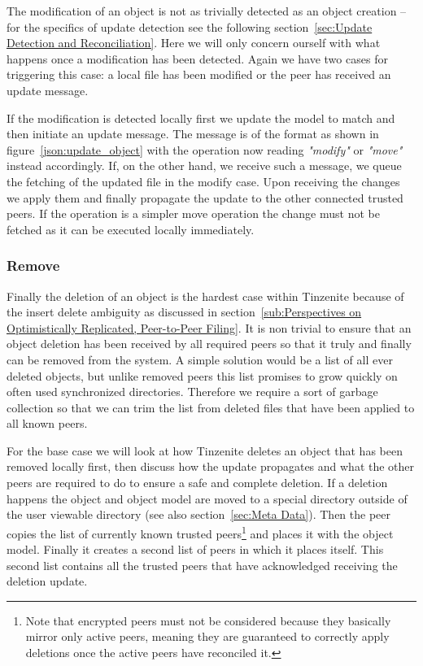 The modification of an object is not as trivially detected as an object creation – for the specifics of update detection see the following section~\ref{sec:Update Detection and Reconciliation}.
Here we will only concern ourself with what happens once a modification has been detected.
Again we have two cases for triggering this case: a local file has been modified or the peer has received an update message.

If the modification is detected locally first we update the model to match and then initiate an update message.
The message is of the format as shown in figure~\ref{json:update_object} with the operation now reading \textit{"modify"} or \textit{"move"} instead accordingly.
If, on the other hand, we receive such a message, we queue the fetching of the updated file in the modify case.
Upon receiving the changes we apply them and finally propagate the update to the other connected trusted peers.
If the operation is a simpler move operation the change must not be fetched as it can be executed locally immediately.

\subsubsection{Remove}
\label{subs:Remove}

Finally the deletion of an object is the hardest case within Tinzenite because of the insert delete ambiguity as discussed in section~\ref{sub:Perspectives on Optimistically Replicated, Peer-to-Peer Filing}.
It is non trivial to ensure that an object deletion has been received by all required peers so that it truly and finally can be removed from the system.
A simple solution would be a list of all ever deleted objects, but unlike removed peers this list promises to grow quickly on often used synchronized directories.
Therefore we require a sort of garbage collection so that we can trim the list from deleted files that have been applied to all known peers.

For the base case we will look at how Tinzenite deletes an object that has been removed locally first, then discuss how the update propagates and what the other peers are required to do to ensure a safe and complete deletion.
If a deletion happens the object and object model are moved to a special directory outside of the user viewable directory (see also section~\ref{sec:Meta Data}).
Then the peer copies the list of currently known trusted peers\footnote{Note that encrypted peers must not be considered because they basically mirror only active peers, meaning they are guaranteed to correctly apply deletions once the active peers have reconciled it.} and places it with the object model.
Finally it creates a second list of peers in which it places itself.
This second list contains all the trusted peers that have acknowledged receiving the deletion update.

